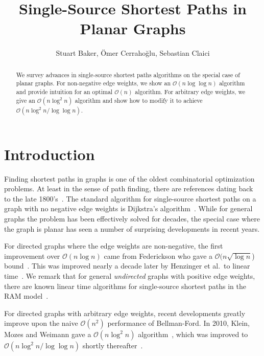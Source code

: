 \documentclass[11pt]{article}
\title{Single-Source Shortest Paths in Planar Graphs}
\author{Stuart Baker, \"{O}mer Cerraho\u{g}lu, Sebastian Claici}
\date{}
\begin{document}
\maketitle

\begin{abstract}

  We survey advances in single-source shortest paths algorithms on the special case of planar graphs. For non-negative edge weights, we show an $\mathcal{O}(n\log \log n)$ algorithm and provide intuition for an optimal $\mathcal{O}(n)$ algorithm. For arbitrary edge weights, we give an $\mathcal{O}(n\log^2 n)$ algorithm and show how to modify it to achieve $\mathcal{O}(n\log^2 n/\log \log n)$.

\end{abstract}

\section{Introduction}
\label{sec:introduction}

Finding shortest paths in graphs is one of the oldest combinatorial optimization problems. At least in the sense of path finding, there are references dating back to the late 1800's~\cite{wiener1873ueber}. The standard algorithm for single-source shortest paths on a graph with no negative edge weights is Dijkstra's algorithm~\cite{dijkstra1959note}. While for general graphs the problem has been effectively solved for decades, the special case where the graph is planar has seen a number of surprising developments in recent years. 

For directed graphs where the edge weights are non-negative, the first improvement over $\mathcal{O}(n\log n)$ came from Federickson who gave a $\mathcal{O}(n \sqrt{\log n}$) bound~\cite{federickson1987fast}. This was improved nearly a decade later by Henzinger et al.\ to linear time~\cite{henzinger1997faster}. We remark that for general \emph{undirected} graphs with positive edge weights, there are known linear time algorithms for single-source shortest paths in the RAM model~\cite{thorup1999undirected}.

For directed graphs with arbitrary edge weights, recent developments greatly improve upon the naive $\mathcal{O}(n^2)$ performance of Bellman-Ford. In 2010, Klein, Mozes and Weimann gave a $\mathcal{O}(n \log^2 n)$ algorithm~\cite{klein2010shortest}, which was improved to $\mathcal{O}(n \log^2 n / \log \log n)$ shortly thereafter~\cite{mozes2010shortest}.
\end{document}
